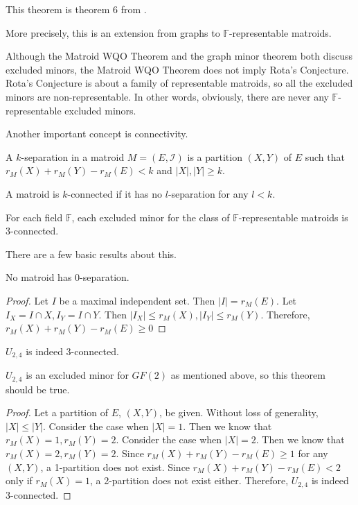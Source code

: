 This theorem is theorem 6 from \cite{solving}.

More precisely, this is an extension from graphs to $\mathbb{F}$-representable matroids.

Although the Matroid WQO Theorem and the graph minor theorem both discuss excluded minors, the Matroid WQO Theorem does not imply Rota's Conjecture.
Rota's Conjecture is about a family of representable matroids, so all the excluded minors are non-representable.
In other words, obviously, there are never any $\mathbb{F}$-representable excluded minors.

%

Another important concept is connectivity.
\begin{defn}
A $k$-separation in a matroid $M = (E, \mathcal{I})$ is a partition $(X, Y)$ of $E$ such that $r_M(X) + r_M(Y) - r_M(E) < k$ and $\lvert X \rvert, \lvert Y \rvert \geq k$.
\end{defn}
\begin{defn}
A matroid is $k$-connected if it has no $l$-separation for any $l < k$.
\end{defn}

\begin{lem}
For each field $\mathbb{F}$, each excluded minor for the class of $\mathbb{F}$-representable matroids is 3-connected.
\end{lem}


There are a few basic results about this.

\begin{thm}
No matroid has 0-separation.
\end{thm}
\begin{proof}
Let $I$ be a maximal independent set.
Then $\lvert I \rvert = r_M(E)$.
Let $I_X = I \cap X, I_Y = I \cap Y$.
Then $\lvert I_X \rvert \leq r_M(X), \lvert I_Y \rvert \leq r_M(Y)$.
Therefore, $r_M(X) + r_M(Y) - r_M(E) \geq 0$
\end{proof}


\begin{thm}
$U_{2, 4}$ is indeed 3-connected.
\end{thm}
$U_{2, 4}$ is an excluded minor for $GF(2)$ as mentioned above, so this theorem should be true.
\begin{proof}
Let a partition of $E$, $(X, Y)$, be given.
Without loss of generality, $\lvert X \rvert \leq \lvert Y \rvert$.
Consider the case when $\lvert X \rvert = 1$.
Then we know that $r_M(X) = 1, r_M(Y) = 2$.
Consider the case when $\lvert X \rvert = 2$.
Then we know that $r_M(X) = 2, r_M(Y) = 2$.
Since $r_M(X) + r_M(Y) - r_M(E) \geq 1$ for any $(X, Y)$, a 1-partition does not exist.
Since $r_M(X) + r_M(Y) - r_M(E) < 2$ only if $r_M(X) = 1$, a 2-partition does not exist either.
Therefore, $U_{2, 4}$ is indeed 3-connected.
\end{proof}


